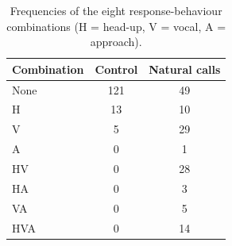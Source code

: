 \begin{table}[H]
\centering
\caption{Frequencies of the eight response-behaviour combinations (H = head-up, V = vocal, A = approach).}
\label{tab:p3combo}
\small
\begin{tabular}{lcc}
\toprule
Combination & Control & Natural calls \\
\midrule
None & 121 & 49 \\
H & 13 & 10 \\
V & 5 & 29 \\
A & 0 & 1 \\
HV & 0 & 28 \\
HA & 0 & 3 \\
VA & 0 & 5 \\
HVA & 0 & 14 \\
\bottomrule
\end{tabular}
\end{table}
